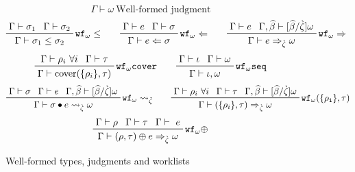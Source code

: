 \documentclass[letterpaper]{article}
\newcommand{\etv}{{\widehat{\beta}}}  %
\newcommand{\stv}{{\grave{\zeta}}}    %
\begin{document}
\begin{figure}
  $$ \boxed{\Gamma\vdash\omega}\ \textrm{Well-formed judgment} $$
  $$ \prftree[r]{$\mathtt{wf_\omega \leq}$}
             {\prfassumption{\Gamma\vdash\sigma_1}}{\prfassumption{\Gamma\vdash\sigma_2}}
             {\Gamma\vdash\sigma_1\leq\sigma_2}\qquad
     \prftree[r]{$\mathtt{wf_\omega\Leftarrow}$}
             {\prfassumption{\Gamma\vdash e}}{\prfassumption{\Gamma\vdash\sigma}}
             {\Gamma\vdash e\Leftarrow\sigma}\qquad
     \prftree[r]{$\mathtt{wf_\omega\Rightarrow}$}
             {\prfassumption{\Gamma\vdash e}}{\prfassumption{\Gamma,\etv\vdash[\etv/\stv]\omega}}
             {\Gamma\vdash e\Rightarrow_\stv\omega} $$
  $$ \prftree[r]{$\mathtt{wf_\omega cover}$}
             {\prfassumption{\Gamma\vdash\rho_i\ \forall i}}
             {\prfassumption{\Gamma\vdash\tau}}
             {\Gamma\vdash\mathrm{cover}(\{\rho_i\}, \tau)}\qquad
     \prftree[r]{$\mathtt{wf_\omega seq}$}
             {\prfassumption{\Gamma\vdash\iota}}
             {\prfassumption{\Gamma\vdash\omega}}
             {\Gamma\vdash\iota,\omega} $$
  $$ \prftree[r]{$\mathtt{wf_\omega \rightsquigarrow_\stv}$}
             {\prfassumption{\Gamma\vdash\sigma}}{\prfassumption{\Gamma\vdash e}}
             {\prfassumption{\Gamma,\etv\vdash[\etv/\stv]\omega}}
             {\Gamma\vdash\sigma\bullet e\rightsquigarrow_\stv\omega}\qquad
     \prftree[r]{$\mathtt{wf_\omega (\{\rho_i\},\tau)}$}
             {\prfassumption{\Gamma\vdash\rho_i\ \forall i}}
             {\prfassumption{\Gamma\vdash\tau}}
             {\prfassumption{\Gamma,\etv\vdash[\etv/\stv]\omega}}
             {\Gamma\vdash(\{\rho_i\},\tau)\Rightarrow_\stv\omega} $$
  $$ \prftree[r]{$\mathtt{wf_\omega \oplus}$}
             {\prfassumption{\Gamma\vdash\rho}}
             {\prfassumption{\Gamma\vdash\tau}}
             {\prfassumption{\Gamma\vdash\ e}}
             {\Gamma\vdash(\rho,\tau)\oplus e\Rightarrow_\stv\omega}
             $$
  \caption{Well-formed types, judgments and worklists}
  \label{f:ts:wf}
\end{figure}
\end{document}
